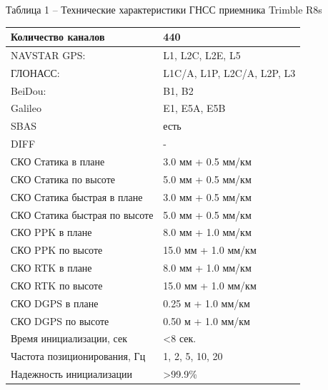\documentclass[a4paper]{article}
\begin{document}
\begin{newpage}

    \begin{center}
        \begin{flushleft}
            Таблица 1 – Технические характеристики ГНСС приемника Trimble R8s
        \end{flushleft}
     
        \begin{tabular}{ | p{200pt} | p{260pt} | }
            \hline
            Количество каналов & 440\\
            \hline
            NAVSTAR GPS: & L1, L2C, L2E, L5\\
            \hline
            ГЛОНАСС: & L1C/A, L1P, L2C/A, L2P, L3\\
            \hline
            BeiDou: & B1, B2\\
            \hline
            Galileo & E1, E5A, E5B\\
            \hline
            SBAS & есть\\
            \hline
            DIFF & -\\
            \hline
            СКО Статика в плане & 3.0 мм + 0.5 мм/км\\
            \hline
            СКО Статика по высоте & 5.0 мм + 0.5 мм/км\\
            \hline
            СКО Статика быстрая в плане & 3.0 мм + 0.5 мм/км\\
            \hline
            СКО Статика быстрая по высоте & 5.0 мм + 0.5 мм/км\\
            \hline
            СКО PPK в плане & 8.0 мм + 1.0 мм/км\\
            \hline
            СКО PPK по высоте & 15.0 мм + 1.0 мм/км\\
            \hline
            СКО RTK в плане & 8.0 мм + 1.0 мм/км\\
            \hline
            СКО RTK по высоте & 15.0 мм + 1.0 мм/км\\
            \hline
            СКО DGPS в плане & 0.25 м + 1.0 мм/км\\
            \hline
            СКО DGPS по высоте & 0.50 м + 1.0 мм/км\\
            \hline
            Время инициализации, сек & <8 сек.\\
            \hline
            Частота позиционирования, Гц  & 1, 2, 5, 10, 20\\
            \hline
            Надежность инициализации & >99.9\%\\

\end{tabular}
\end{center}
\end{newpage}
\end{document}
